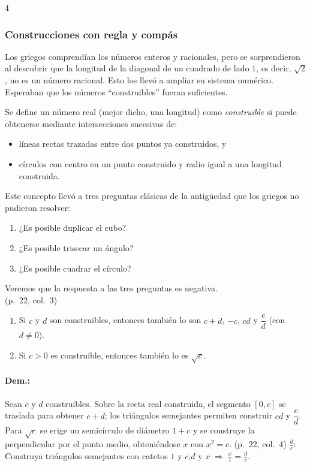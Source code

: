 \documentclass[landscape,a4paper]{article}
\begin{document}
\begin{multicols}{4}
\subsubsection*{Construcciones con regla y compás}
Los griegos comprendían los números enteros y racionales, pero se sorprendieron al descubrir que la longitud de la diagonal de un cuadrado de lado $1$, es decir, $\sqrt{2}$, no es un número racional.  Esto los llevó a ampliar su sistema numérico.  Esperaban que los números “construibles” fueran suficientes.

Se define un número real (mejor dicho, una longitud) como \emph{construible} si puede obtenerse mediante intersecciones sucesivas de:
\begin{itemize}
  \item líneas rectas trazadas entre dos puntos ya construidos, y
  \item círculos con centro en un punto construido y radio igual a una longitud construida.
\end{itemize}

Este concepto llevó a tres preguntas clásicas de la antigüedad que los griegos no pudieron resolver:
\begin{enumerate}
  \item ¿Es posible duplicar el cubo?\\[-0.7em]
  \item ¿Es posible trisecar un ángulo?\\[-0.7em]
  \item ¿Es posible cuadrar el círculo?
\end{enumerate}
Veremos que la respuesta a las tres preguntas es negativa.\\ (p.~22, col.~3)
\begin{tcolorbox}[colback=white,colframe=red!80!black,colbacktitle=red!80!black,coltitle=white,title={Lema (p.~22, col.~4)}]
\begin{enumerate}
  \item[(a)] Si $c$ y $d$ son construibles, entonces también lo son $c+d$, $-c$, $cd$ y $\dfrac{c}{d}$ \;(con $d\neq0$).
  \item[(b)] Si $c>0$ es construible, entonces también lo es $\sqrt{c}$.
\end{enumerate}
\end{tcolorbox}
\paragraph{Dem.:} Sean $c$ y $d$ construibles.  Sobre la recta real construida, el segmento $[0,c]$ se traslada para obtener $c+d$; los triángulos semejantes permiten construir $cd$ y $\dfrac{c}{d}$.  Para $\sqrt{c}$ se erige un semicírculo de diámetro $1+c$ y se construye la perpendicular por el punto medio, obteniéndose $x$ con $x^{2}=c$.  \hfill(p.~22, col.~4)
$\frac{d}{c}$: Construya triángulos semejantes con catetos $1$ y $c$,$d$  y $x\;\Rightarrow\; \frac{x}{1}=\frac{d}{c}$.


\end{multicols}
\end{document}
